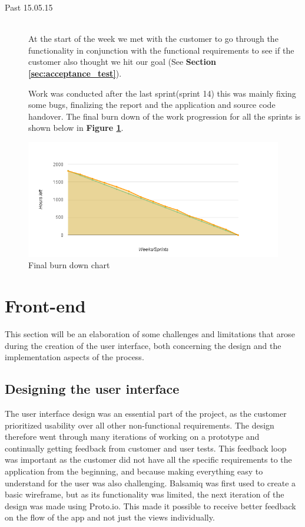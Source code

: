 \begin{description}
	\item[Past 15.05.15] \hfill \\ 
	At the start of the week we met with the customer to go through the functionality in conjunction with the functional requirements to see if the customer also thought we hit our goal (See \textbf {Section \ref{sec:acceptance_test}}).\newline
	  
	Work was conducted after the last sprint(sprint 14) this was mainly fixing some bugs, finalizing the report and the application and source code handover. The final burn down of the work progression for all the sprints is shown below in \textbf {Figure \ref{Fig:burnDownAfter}}.
	
\end{description}

\begin{figure}[h!]
	\centering
	\includegraphics[width=\textwidth]{fig/burnDownAfter}
	\caption{Final burn down chart}
	\label{Fig:burnDownAfter}
\end{figure}

\section{Front-end}

This section will be an elaboration of some challenges and limitations that arose during the creation of the user interface, both concerning the design and the implementation aspects of the process.

\subsection{Designing the user interface}
\label{subsec:prototype}
The user interface design was an essential part of the project, as the customer prioritized usability over all other non-functional requirements. The design therefore went through many iterations of working on a prototype and continually getting feedback from customer and user tests. This feedback loop was important as the customer did not have all the specific requirements to the application from the beginning, and because making everything easy to understand for the user was also challenging. Balsamiq was first used to create a basic wireframe, but as its functionality was limited, the next iteration of the design was made using Proto.io. This made it possible to receive better feedback on the flow of the app and not just the views individually. \newline

